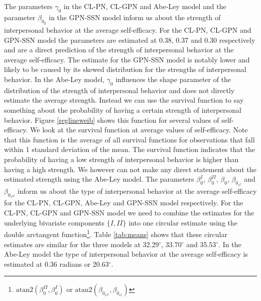 \documentclass[man]{apa6}
\let\rmarkdownfootnote\footnote%
\def\footnote{\protect\rmarkdownfootnote}
\theoremstyle{definition}
\theoremstyle{definition}
\theoremstyle{definition}
\theoremstyle{remark}
\begin{document}
The parameters \(\gamma_0\) in the CL-PN, CL-GPN and Abe-Ley model and
the parameter \(\beta_{0_y}\) in the GPN-SSN model inform us about the
strength of interpersonal behavior at the average self-efficacy. For the
CL-PN, CL-GPN and GPN-SSN model the parameters are estimated at 0.38,
0.37 and 0.30 respectively and are a direct prediction of the strength
of interpersonal behavior at the average self-efficacy. The estimate for
the GPN-SSN model is notably lower and likely to be caused by its skewed
distribution for the strengths of interpersonal behavior. In the Abe-Ley
model, \(\gamma_0\) influences the shape parameter of the distribution
of the strength of interpersonal behavior and does not directly estimate
the average strength. Instead we can use the survival function to say
something about the probability of having a certain strength of
interpersonal behavior. Figure \ref{reglineweib} shows this function for
several values of self-efficacy. We look at the survival function at
average values of self-efficacy. Note that this function is the average
of all survival functions for observations that fall within 1 standard
deviation of the mean. The survival function indicates that the
probability of having a low strength of interpersonal behavior is higher
than having a high strength. We however can not make any direct
statement about the estimated strength using the Abe-Ley model.\newline
\indent The parameters \(\beta_0^{I}\), \(\beta_0^{II}\), \(\beta_0\),
\(\beta_{0_{s^{I}}}\) and \(\beta_{0_{s^{II}}}\) inform us about the
type of interpersonal behavior at the average self-efficacy for the
CL-PN, CL-GPN, Abe-Ley and GPN-SSN model respectively. For the CL-PN,
CL-GPN and GPN-SSN model we need to combine the estimates for the
underlying bivariate components \(\{I, II\}\) into one circular estimate
using the double arctangent
function\footnote{\(\mbox{atan2}(\beta_0^{II}, \beta_0^{I})\) or
\(\mbox{atan2}(\beta_{0_{s^{II}}}, \beta_{0_{s^{I}}})\)}. Table
\ref{tab:means} shows that these circular estimates are similar for the
three models at 32.29\(^\circ\), 33.70\(^\circ\) and 35.53\(^\circ\). In
the Abe-Ley model the type of interpersonal behavior at the average
self-efficacy is estimated at 0.36 radians or 20.63\(^\circ\).
\end{document}
